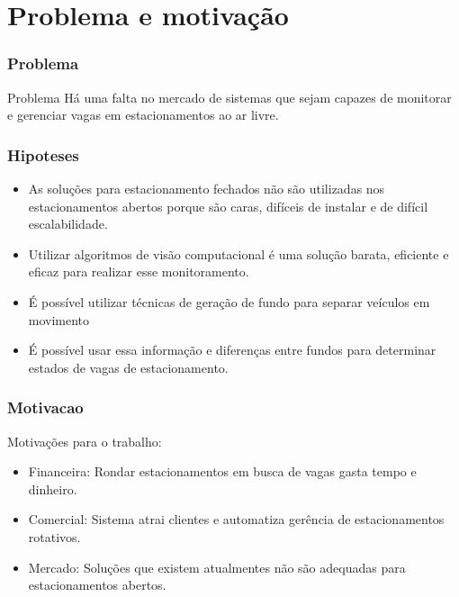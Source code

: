 \documentclass{beamer}
\begin{document}
\section{Problema e motivação}

\begin{frame}
\frametitle{Problema}

\begin{block}{Problema}
    Há uma falta no mercado de sistemas que sejam capazes de monitorar e gerenciar vagas em estacionamentos ao ar livre.
\end{block}
\end{frame}

\begin{frame}
 \frametitle{Hipoteses}
 \begin{itemize}
   \item  As soluções para estacionamento fechados não são utilizadas nos estacionamentos abertos porque são caras, difíceis de instalar e de difícil escalabilidade.
   \item  Utilizar algoritmos de visão computacional é uma solução barata, eficiente e eficaz para realizar esse monitoramento.
   \item  É possível utilizar técnicas de geração de fundo para separar veículos em movimento
   \item  É possível usar essa informação e diferenças entre fundos para determinar estados de vagas de estacionamento.
 \end{itemize}
\end{frame}

\begin{frame}
\frametitle{Motivacao}
Motivações para o trabalho:
\begin{itemize}
  \item Financeira: Rondar estacionamentos em busca de vagas gasta tempo e dinheiro.
  \item Comercial: Sistema atrai clientes e automatiza gerência de estacionamentos rotativos.
  \item Mercado: Soluções que existem atualmentes não são adequadas para estacionamentos abertos.
\end{itemize}

\end{frame}
\end{document}
